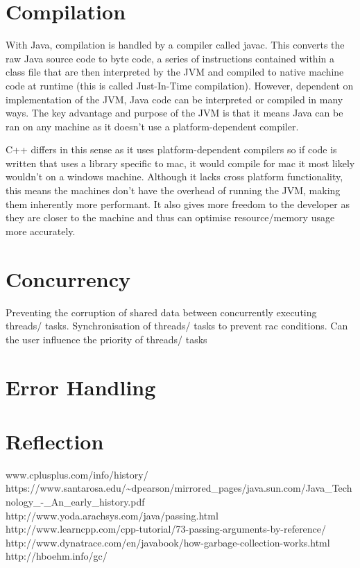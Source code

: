 \documentclass[]{report}
\begin{document}
\section{Compilation}
With Java, compilation is handled by a compiler called javac. This converts the raw Java source code to byte code, a series of instructions contained within a class file that are then interpreted by the JVM and compiled to native machine code at runtime (this is called Just-In-Time compilation). However, dependent on implementation of the JVM, Java code can be interpreted or compiled in many ways. The key advantage and purpose of the JVM is that it means Java can be ran on any machine as it doesn't use a platform-dependent compiler.

C++ differs in this sense as it uses platform-dependent compilers so if code is written that uses a library specific to mac, it would compile for mac it most likely wouldn't on a windows machine. Although it lacks cross platform functionality, this means the machines don't have the overhead of running the JVM, making them inherently more performant. It also gives more freedom to the developer as they are closer to the machine	and thus can optimise resource/memory usage more accurately.

\section{Concurrency}
Preventing the corruption of shared data between
concurrently executing threads/ tasks.
Synchronisation of threads/ tasks to prevent rac
conditions.
Can the user influence the priority of threads/ tasks

\section{Error Handling}

\section{Reflection}

\begin{thebibliography}{20}
	www.cplusplus.com/info/history/
	https://www.santarosa.edu/\textasciitilde{}dpearson/mirrored\_pages/java.sun.com/Java\_Technology\_-\_An\_early\_history.pdf
	http://www.yoda.arachsys.com/java/passing.html
	http://www.learncpp.com/cpp-tutorial/73-passing-arguments-by-reference/
	http://www.dynatrace.com/en/javabook/how-garbage-collection-works.html
		http://hboehm.info/gc/
\end{thebibliography}
\end{document}

